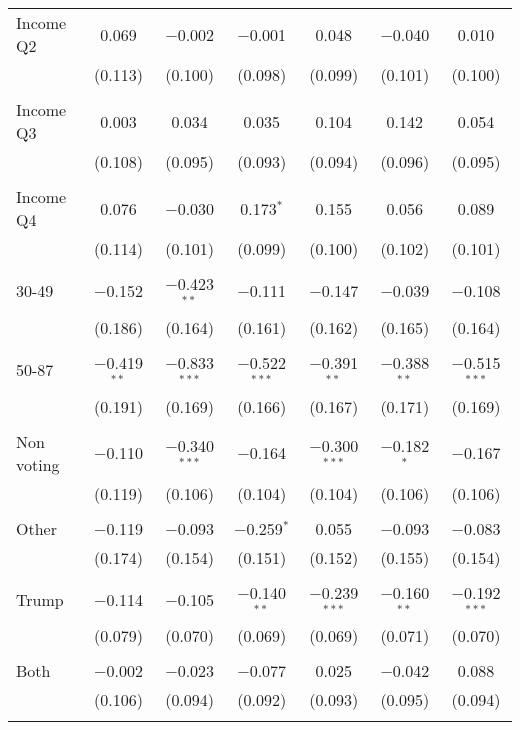 \begin{tabular}{@{\extracolsep{5pt}}lcccccc}
 Income Q2 & 0.069 & $-$0.002 & $-$0.001 & 0.048 & $-$0.040 & 0.010 \\ 
  & (0.113) & (0.100) & (0.098) & (0.099) & (0.101) & (0.100) \\ 
  & & & & & & \\ 
 Income Q3 & 0.003 & 0.034 & 0.035 & 0.104 & 0.142 & 0.054 \\ 
  & (0.108) & (0.095) & (0.093) & (0.094) & (0.096) & (0.095) \\ 
  & & & & & & \\ 
 Income Q4 & 0.076 & $-$0.030 & 0.173$^{*}$ & 0.155 & 0.056 & 0.089 \\ 
  & (0.114) & (0.101) & (0.099) & (0.100) & (0.102) & (0.101) \\ 
  & & & & & & \\ 
 30-49 & $-$0.152 & $-$0.423$^{**}$ & $-$0.111 & $-$0.147 & $-$0.039 & $-$0.108 \\ 
  & (0.186) & (0.164) & (0.161) & (0.162) & (0.165) & (0.164) \\ 
  & & & & & & \\ 
 50-87 & $-$0.419$^{**}$ & $-$0.833$^{***}$ & $-$0.522$^{***}$ & $-$0.391$^{**}$ & $-$0.388$^{**}$ & $-$0.515$^{***}$ \\ 
  & (0.191) & (0.169) & (0.166) & (0.167) & (0.171) & (0.169) \\ 
  & & & & & & \\ 
 Non voting & $-$0.110 & $-$0.340$^{***}$ & $-$0.164 & $-$0.300$^{***}$ & $-$0.182$^{*}$ & $-$0.167 \\ 
  & (0.119) & (0.106) & (0.104) & (0.104) & (0.106) & (0.106) \\ 
  & & & & & & \\ 
 Other & $-$0.119 & $-$0.093 & $-$0.259$^{*}$ & 0.055 & $-$0.093 & $-$0.083 \\ 
  & (0.174) & (0.154) & (0.151) & (0.152) & (0.155) & (0.154) \\ 
  & & & & & & \\ 
 Trump & $-$0.114 & $-$0.105 & $-$0.140$^{**}$ & $-$0.239$^{***}$ & $-$0.160$^{**}$ & $-$0.192$^{***}$ \\ 
  & (0.079) & (0.070) & (0.069) & (0.069) & (0.071) & (0.070) \\ 
  & & & & & & \\ 
 Both & $-$0.002 & $-$0.023 & $-$0.077 & 0.025 & $-$0.042 & 0.088 \\ 
  & (0.106) & (0.094) & (0.092) & (0.093) & (0.095) & (0.094) \\ 
  & & & & & & \\ 

\end{tabular}
